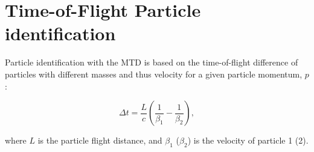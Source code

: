 \section{Time-of-Flight Particle identification}
\label{sec:pid}
Particle identification with the MTD is based on the time-of-flight 
difference of particles with different masses and thus velocity for 
a given particle momentum, $p$:

\begin{equation}
\label{eq:tof}
\Delta t = \frac{L}{c}\left( \frac{1}{\beta_{1}} - \frac{1}{\beta_{2}}\right),
\end{equation}

\noindent where $L$ is the particle flight distance, and $\beta_1$ ($\beta_2$) 
is the velocity of particle 1 (2). 



